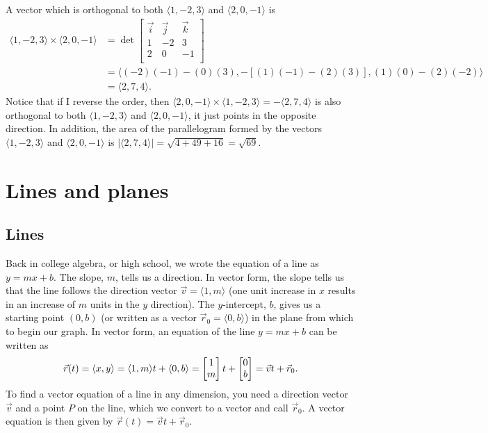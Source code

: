 A vector which is orthogonal to both $\langle1,-2,3\rangle$ and
$\langle2,0,-1\rangle$  is 
\begin{align*}
  \langle1,-2,3\rangle\times \langle2,0,-1\rangle &=
  \det\begin{bmatrix}\vec i & \vec j&\vec k\\ 1&-2&3\\
    2&0&-1\\\end{bmatrix} \\
  &= \langle(-2)(-1)-(0)(3),-[
  (1)(-1)-(2)(3)],(1)(0)-(2)(-2)\rangle \\
  &= \langle2,7,4\rangle.
\end{align*}
Notice that if I reverse the order, then $\langle2,0,-1\rangle \times\langle1,-2,3\rangle =
-\langle2,7,4\rangle$ is also orthogonal to both $\langle1,-2,3\rangle$ and $\langle2,0,-1\rangle$, it
just points in the opposite direction. In addition, the area of the
parallelogram formed by the vectors $\langle1,-2,3\rangle$ and $\langle2,0,-1\rangle$ is
$|\langle2,7,4\rangle| = \sqrt{4+49+16}=\sqrt{69}$.










\section{Lines and planes}
\subsection{Lines}
Back in college algebra, or high school, we wrote the equation of a
line as {$y=mx+b$}.  The slope, {$m$}, tells us a direction. In vector
form, the slope tells us that the line follows the direction vector
{$\vec v = \langle1,m\rangle$} (one unit increase in $x$ results in an
increase of $m$ units in the $y$ direction). The {$y$}-intercept,
{$b$}, gives us a starting point $(0,b)$ (or written as a vector
{$\vec{r}_0 = \langle0,b\rangle$}) in the plane from which to begin our
graph. In vector form, an equation of the line $y=mx+b$ can be written
as $$\vec r(t) = \langle x,y\rangle =\langle1,m\rangle t
+\langle0,b\rangle= \begin{bmatrix}1\\m\end{bmatrix} t
+\begin{bmatrix}0\\b\end{bmatrix} = \vec v t+ \vec{r}_0.$$
To find a vector equation of a line in any dimension, you need a
direction vector $\vec v$ and a point $P$ on the line, which we
convert to a vector and call $\vec{r}_0$. A vector equation is then
given by $\vec r(t) = \vec v t+ \vec{r}_0$.

